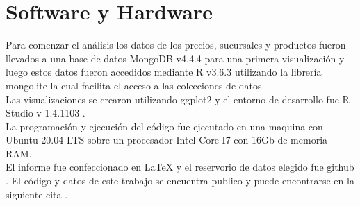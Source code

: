 \section{Software y Hardware}
Para comenzar el análisis los datos de los precios, sucursales y productos fueron llevados a una base de datos MongoDB v4.4.4\cite{mongodb} para una primera visualización y luego estos datos fueron accedidos mediante R v3.6.3 \cite{R} utilizando la librería mongolite \cite{mongolite} la cual facilita el acceso a las colecciones de datos.\\
Las visualizaciones se crearon utilizando ggplot2 \cite{ggplot2} y el entorno de desarrollo fue R Studio v 1.4.1103 \cite{rstudio}.\\
La programación y ejecución del código fue ejecutado en una maquina con Ubuntu 20.04 LTS sobre un procesador Intel Core I7 con 16Gb de memoria RAM.\\
El informe fue confeccionado en LaTeX \cite{latex} y el reservorio de datos elegido fue github \cite{github}.
El código y datos de este trabajo se encuentra publico y puede encontrarse en la siguiente cita \cite{repo}.